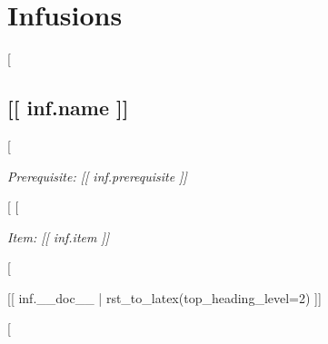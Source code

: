 \section*{Infusions}
[%

  \subsection*{[[ inf.name ]]}

  [%

		\noindent
    \textit{Prerequisite: [[ inf.prerequisite ]]}%

  [%
  [%

    \noindent
    \textit{Item: [[ inf.item ]]}%

  [%

  [[ inf.__doc__ | rst_to_latex(top_heading_level=2) ]]

[%